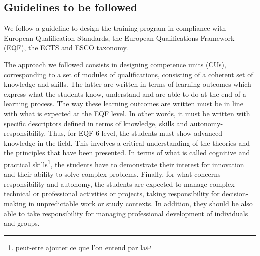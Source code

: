 \documentclass{article}
\begin{document}
\subsection{Guidelines to be followed}
We follow a guideline to design the training program in compliance with European Qualification Standards, the European Qualifications Framework (EQF), the ECTS and ESCO taxonomy.

The approach we followed consists in designing competence units (CUs), corresponding to a set of modules of qualifications, consisting of a coherent set of knowledge and skills. The latter are written in terms of learning outcomes which express what the students know, understand and are able to do at the end of a learning process. The way these learning outcomes are written must be in line with what is expected at the EQF level. In other words, it must be written with specific descriptors defined in terms of knowledge, skills and autonomy-responsibility. Thus, for EQF 6 level, the students must show advanced knowledge in the field. This involves a critical understanding of the theories and the principles that have been presented. In terms of what is called cognitive and practical skills\footnote{peut-etre ajouter ce que l'on entend par la}, the students have to demonstrate their interest for innovation and their ability to solve complex problems. Finally, for what concerns responsibility and autonomy, the students are expected to manage complex technical or professional activities or projects, taking responsibility for decision-making in unpredictable work or study contexts. In addition, they should be also able to take responsibility for managing professional development of individuals and groups. 
\end{document}
